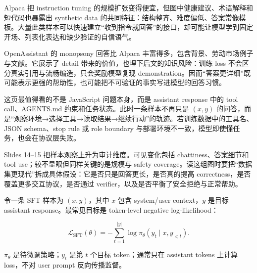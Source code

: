 
Alpaca 把 instruction tuning 的规模扩张变得便宜，但图中健康建议、术语解释和短代码也暴露出 synthetic data 的共同特征：结构整齐、难度偏低、答案常像模板。大量此类样本可以快速建立“收到指令就回答”的接口，却可能让模型学到固定开场、列表化表达和缺少验证的自信语气。


OpenAssistant 的 monopsony 回答比 Alpaca 丰富得多，包含背景、劳动市场例子与文献。它展示了 detail 带来的价值，也埋下后文的知识风险：训练 loss 不会区分真实引用与流畅编造，只会奖励模型复现 demonstration。因而“答案更详细”既可能表示更强的帮助性，也可能把不可验证的事实写进模型的回答习惯。


这页最值得看的不是 JavaScript 问题本身，而是 assistant response 中的 tool call、AGENTS.md 约束和任务状态。此时一条样本不再只是 $(x,y)$ 的问答，而是“观察环境→选择工具→读取结果→继续行动”的轨迹。若训练数据中的工具名、JSON schema、stop rule 或 role boundary 与部署环境不一致，模型即使懂任务，也会在协议层失败。


Slides 14--15 把样本观察上升为审计维度。可见变化包括 chattiness、答案细节和 tool use；较不显眼但同样关键的是规模与 safety coverage。读这组图时要把“数据集更现代”拆成具体假设：它是否只是回答更长，是否真的提高 correctness，是否覆盖更多交互协议，是否通过 verifier，以及是否平衡了安全拒绝与正常帮助。

令一条 SFT 样本为 $(x,y)$，其中 $x$ 包含 system/user context，$y$ 是目标 assistant response。最常见目标是 token-level negative log-likelihood：

$$
\mathcal{L}_{\mathrm{SFT}}(\theta)
=-\sum_{t=1}^{|y|}\log \pi_\theta(y_t\mid x,y_{<t}).
$$

$\pi_\theta$ 是待微调策略；$y_t$ 是第 $t$ 个目标 token；通常只在 assistant tokens 上计算 loss，不对 user prompt 反向传播监督。

